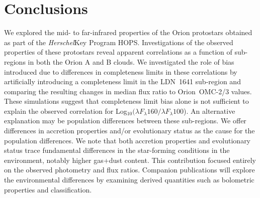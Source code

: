 \documentclass[manuscript]{aastex61}
\newcommand{\herschel}{{\em Herschel}}
\newcommand{\clrb}{Log$_{10}(\lambda F_\lambda160/\lambda F_\lambda100$)}
\begin{document}
\section{Conclusions}
\label{sec:conc}

We explored the mid- to far-infrared properties of the Orion protostars obtained as part of the \herschel Key Program HOPS. Investigations of the observed properties of these protostars reveal apparent correlations as a function of sub-regions in both the Orion A and B clouds.  We investigated the role of bias introduced due to differences in completeness limits in these correlations by artificially introducing a completeness limit in the LDN~1641 sub-region and comparing the resulting changes in median flux ratio to Orion~OMC-2/3 values. These simulations suggest that completeness limit bias alone is not sufficient to explain the observed correlation for \clrb.  An alternative explanation may be population differences between these sub-regions. We offer
differences in accretion properties and/or evolutionary status as the cause for the population differences. We note that both accretion properties and evolutionary status trace fundamental differences in the star-forming conditions in the environment, notably higher gas+dust content.  This contribution focused entirely on the observed photometry and flux ratios.   Companion publications will explore the environmental differences by examining derived quantities such as bolometric properties and classification.
\end{document}
